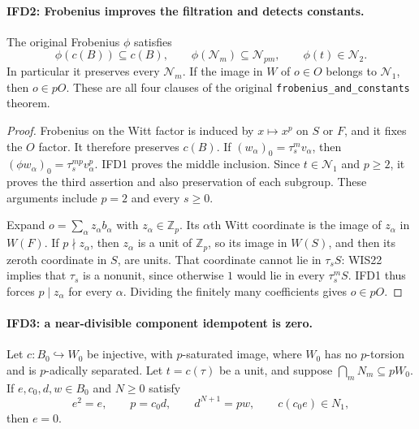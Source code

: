 \documentclass[11pt,a4paper]{article}
\numberwithin{equation}{section}
\theoremstyle{remark}\newtheorem{remark}[theorem]{Remark}
\begin{document}
\paragraph{IFD2: Frobenius improves the filtration and detects constants.}
\label{claim:IFD2}
The original Frobenius $\phi$ satisfies
\[
 \phi(c(B))\subseteq c(B),\qquad
 \phi(\mathcal N_m)\subseteq\mathcal N_{pm},\qquad
 \phi(t)\in\mathcal N_2.                                      \tag{IFD.4}
\]
In particular it preserves every $\mathcal N_m$. If the image in $W$
of $o\in O$ belongs to $\mathcal N_1$, then $o\in pO$.
These are all four clauses of the original
\texttt{frobenius\_\allowbreak and\_\allowbreak constants} theorem.

\begin{proof}
Frobenius on the Witt factor is induced by $x\mapsto x^p$ on $S$ or
$F$, and it fixes the $O$ factor. It therefore preserves $c(B)$.
If $(w_\alpha)_0=\tau_s^m v_\alpha$, then
$(\phi w_\alpha)_0=\tau_s^{mp}v_\alpha^p$.
IFD1 proves the middle inclusion. Since $t\in\mathcal N_1$ and
$p\geq2$, it proves the third assertion and also preservation of
each subgroup. These arguments include $p=2$ and every $s\geq0$.

Expand $o=\sum_\alpha z_\alpha b_\alpha$ with $z_\alpha\in\mathbb Z_p$.
Its $\alpha$th Witt coordinate is the image of $z_\alpha$ in $W(F)$.
If $p\nmid z_\alpha$, then $z_\alpha$ is a unit of $\mathbb Z_p$,
so its image in $W(S)$, and then its zeroth coordinate in $S$, are
units. That coordinate cannot lie in $\tau_s S$: WIS22 implies
that $\tau_s$ is a nonunit, since otherwise $1$ would lie in every
$\tau_s^mS$. IFD1 thus forces $p\mid z_\alpha$ for every $\alpha$.
Dividing the finitely many coefficients gives $o\in pO$.
\end{proof}

\paragraph{IFD3: a near-divisible component idempotent is zero.}
\label{claim:IFD3}
Let $c:B_0\hookrightarrow W_0$ be injective, with $p$-saturated image,
where $W_0$ has no $p$-torsion and is $p$-adically separated.
Let $t=c(\tau)$ be a unit, and suppose $\bigcap_mN_m\subseteq pW_0$.
If $e,c_0,d,w\in B_0$ and $N\geq0$ satisfy
\[
 e^2=e,\qquad p=c_0d,\qquad d^{N+1}=pw,
                 \qquad c(c_0e)\in N_1,
                                                               \tag{IFD.5}
\]
then $e=0$.
\end{document}
